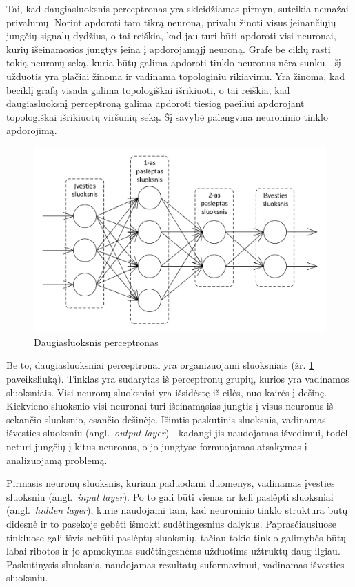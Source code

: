\documentclass{VUMIFPSbakalaurinis}
\begin{document}
Tai, kad daugiasluoksnis perceptronas yra skleidžiamas pirmyn, suteikia nemažai privalumų.
Norint apdoroti tam tikrą neuroną, privalu žinoti visus įeinančiųjų jungčių signalų dydžius, o tai reiškia, kad jau turi būti apdoroti visi neuronai, kurių išeinamosios jungtys įeina į apdorojamąjį neuroną.
Grafe be ciklų rasti tokią neuronų seką, kuria būtų galima apdoroti tinklo neuronus nėra sunku - šį užduotis yra plačiai žinoma ir vadinama topologiniu rikiavimu.
Yra žinoma, kad beciklį grafą visada galima topologiškai išrikiuoti, o tai reiškia, kad daugiasluoksnį perceptroną galima apdoroti tiesiog paeiliui apdorojant topologiškai išrikiuotų viršūnių seką.
Šį savybė palengvina neuroninio tinklo apdorojimą.

\begin{figure}
	\includegraphics[scale=0.75]{diagrams/2_neural_network}
	\caption{Daugiasluoksnis perceptronas}
	\label{fig:neural_network}
\end{figure}

Be to, daugiasluoksniai perceptronai yra organizuojami sluoksniais (žr. \ref{fig:neural_network} paveiksliuką).
Tinklas yra sudarytas iš perceptronų grupių, kurios yra vadinamos sluoksniais.
Visi neuronų sluoksniai yra išsidėstę iš eilės, nuo kairės į dešinę.
Kiekvieno sluoksnio visi neuronai turi išeinamąsias jungtis į visus neuronus iš sekančio sluoksnio, esančio dešinėje.
Išimtis paskutinis sluoksnis, vadinamas išvesties sluoksniu (angl.~\textit{output layer}) - kadangi jis naudojamas išvedimui, todėl neturi jungčių į kitus neuronus, o jo jungtyse formuojamas atsakymas į analizuojamą problemą.

Pirmasis neuronų sluoksnis, kuriam paduodami duomenys, vadinamas įvesties sluoksniu (angl.~\textit{input layer}).
Po to gali būti vienas ar keli paslėpti sluoksniai (angl.~\textit{hidden layer}), kurie naudojami tam, kad neuroninio tinklo struktūra būtų didesnė ir to pasekoje gebėti išmokti sudėtingesnius dalykus.
Paprasčiausiuose tinkluose gali išvis nebūti paslėptų sluoksnių, tačiau tokio tinklo galimybės būtų labai ribotos ir jo apmokymas sudėtingesnėms užduotims užtruktų daug ilgiau.
Paskutinysis sluoksnis, naudojamas rezultatų suformavimui, vadinamas išvesties sluoksniu.
\end{document}
